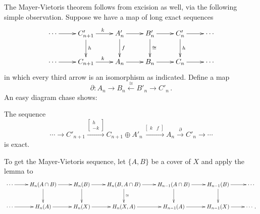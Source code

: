 The Mayer-Vietoris theorem follows from excision as well, via
the following simple observation.
Suppose we have a map of long exact sequences
\begin{equation*}
\xymatrix{
\cdots\ar[r] & C'_{n+1} \ar[r]^k\ar[d]^h & A'_n\ar[r]\ar[d]^f & 
B'_n\ar[r]\ar[d]^\cong & C'_n\ar[r]\ar[d]^h &  \cdots\\
\cdots\ar[r] & C_{n+1} \ar[r]^k & A_n \ar[r] & B_n \ar[r] & C_n \ar[r] & \cdots
}
\end{equation*}
in which every third arrow is an isomorphism as indicated.
Define a map
\[
\partial:A_n\to B_n\xleftarrow{\cong} B'_n\to C'_n\,.
\]
An easy diagram chase shows:
\begin{lemma} 
\label{lem-ladder}
The sequence 
\begin{equation*}
\cdots\longrightarrow 
C'_{n+1}\xrightarrow{\left[\begin{array}{c}h\\-k\end{array}\right]}
C_{n+1}\oplus A'_n\xrightarrow{\left[\begin{array}{cc}k&f\end{array}\right]}
A_n\xrightarrow{\,\,\partial\,\,} C'_n\longrightarrow\cdots
\end{equation*}
is exact.
\end{lemma}
To get the Mayer-Vietoris sequence, let $\{A,B\}$ be a cover of $X$ 
and apply the lemma to 
\[
\xymatrix{
\cdots \ar[r] & H_n(A\cap B) \ar[d] \ar[r] & H_n(B)  \ar[d] \ar[r] &
H_n(B,A\cap B) \ar[d]^\cong \ar[r] & H_{n-1}(A\cap B) \ar[d] \ar[r] &
H_{n-1}(B) \ar[d] \ar[r] & \cdots \\
\cdots \ar[r] & H_n(A) \ar[r] & H_n(X) \ar[r] & H_n(X,A) \ar[r] & 
H_{n-1}(A) \ar[r] & H_{n-1}(X) \ar[r] & \cdots\,.
}\]

